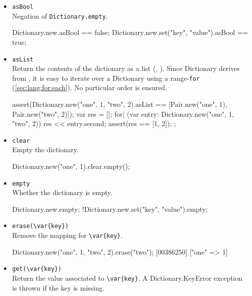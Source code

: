 \begin{itemize}
\item \lstinline|asBool|\\
  Negation of \lstinline|Dictionary.empty|.
\begin{urbiassert}
Dictionary.new.asBool == false;
Dictionary.new.set("key", "value").asBool == true;
\end{urbiassert}

\item \lstinline|asList|\\
  Return the contents of the dictionary as a  list
  (, ).  Since Dictionary derives from
  , it is easy to iterate over a Dictionary
  using a range-\lstinline|for| (\autoref{sec:lang:for:each}).  No
  particular order is ensured.

\begin{urbiscript}
assert(Dictionary.new("one", 1, "two", 2).asList
       == [Pair.new("one", 1), Pair.new("two", 2)]);
{
  var res = [];
  for| (var entry: Dictionary.new("one", 1, "two", 2))
    res << entry.second;
  assert(res == [1, 2]);
};
\end{urbiscript}

\item \lstinline|clear|\\
  Empty the dictionary.

\begin{urbiassert}
Dictionary.new("one", 1).clear.empty();
\end{urbiassert}

\item \lstinline|empty|\\
  Whether the dictionary is empty.

\begin{urbiassert}
Dictionary.new.empty;
!Dictionary.new.set("key", "value").empty;
\end{urbiassert}

\item \lstinline|erase(\var{key})|\\
  Remove the mapping for \lstinline|\var{key}|.

\begin{urbiscript}
Dictionary.new("one", 1, "two", 2).erase("two");
[00386250] ["one" => 1]
\end{urbiscript}

\item \lstinline|get(\var{key})|\\
  Return the value associated to \lstinline|\var{key}|.  A
  Dictionary.KeyError exception is thrown if the key is missing.


\end{itemize}
